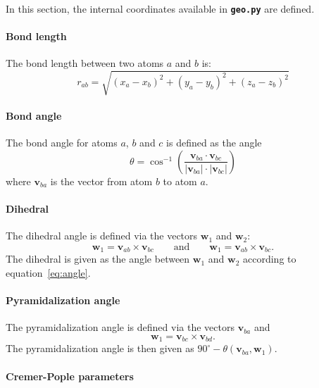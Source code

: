 \documentclass[a4paper,11pt,DIV=15,openany,twoside=false]{scrbook}
\newcommand{\ttt}[1]{\textbf{\texttt{#1}}}
\newcommand{\VEC}[1]{\ensuremath{\mathbf{#1}}}
\begin{document}
In this section, the internal coordinates available in \ttt{geo.py} are defined.

\paragraph{Bond length}

The bond length between two atoms $a$ and $b$ is:
\begin{equation}
  r_{ab}=
  \sqrt{
    (x_a-x_b)^2+(y_a-y_b)^2+(z_a-z_b)^2
  }
\end{equation}

\paragraph{Bond angle}

The bond angle for atoms $a$, $b$ and $c$ is defined as the angle
\begin{equation}
  \theta=
  \cos^{-1}\left(
    \frac{\VEC{v}_{ba}\cdot\VEC{v}_{bc}}{|\VEC{v}_{ba}|\cdot|\VEC{v}_{bc}|}
  \right)\label{eq:angle}
\end{equation}
where $\VEC{v}_{ba}$ is the vector from atom $b$ to atom $a$.

\paragraph{Dihedral}

The dihedral angle is defined via the vectors $\VEC{w}_1$ and $\VEC{w}_2$:
\begin{equation}
  \VEC{w}_1=\VEC{v}_{ab}\times\VEC{v}_{bc}\qquad\text{and}\qquad\VEC{w}_1=\VEC{v}_{ab}\times\VEC{v}_{bc}.
\end{equation}
The dihedral is given as the angle between $\VEC{w}_1$ and $\VEC{w}_2$ according to equation~\eqref{eq:angle}.

\paragraph{Pyramidalization angle}

The pyramidalization angle is defined via the vectors $\VEC{v}_{ba}$ and 
\begin{equation}
  \VEC{w}_1=\VEC{v}_{bc}\times\VEC{v}_{bd}.
\end{equation}
The pyramidalization angle is then given as $90^\circ - \theta(\VEC{v}_{ba},\VEC{w}_1)$.

\paragraph{Cremer-Pople parameters}
\end{document}
